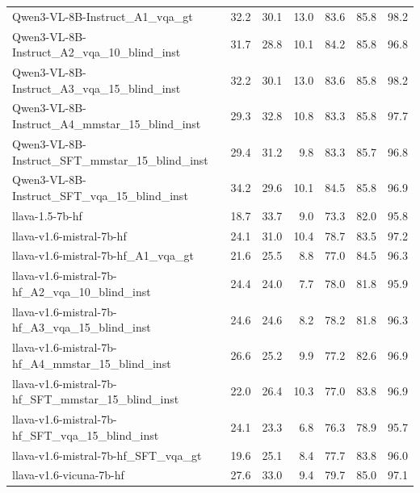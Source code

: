\begin{tabular}{lrrrrrr}
Qwen3-VL-8B-Instruct_A1_vqa_gt & 32.2 & 30.1 & 13.0 & 83.6 & 85.8 & 98.2 \\
Qwen3-VL-8B-Instruct_A2_vqa_10_blind_inst & 31.7 & 28.8 & 10.1 & 84.2 & 85.8 & 96.8 \\
Qwen3-VL-8B-Instruct_A3_vqa_15_blind_inst & 32.2 & 30.1 & 13.0 & 83.6 & 85.8 & 98.2 \\
Qwen3-VL-8B-Instruct_A4_mmstar_15_blind_inst & 29.3 & 32.8 & 10.8 & 83.3 & 85.8 & 97.7 \\
Qwen3-VL-8B-Instruct_SFT_mmstar_15_blind_inst & 29.4 & 31.2 & 9.8 & 83.3 & 85.7 & 96.8 \\
Qwen3-VL-8B-Instruct_SFT_vqa_15_blind_inst & 34.2 & 29.6 & 10.1 & 84.5 & 85.8 & 96.9 \\
llava-1.5-7b-hf & 18.7 & 33.7 & 9.0 & 73.3 & 82.0 & 95.8 \\
llava-v1.6-mistral-7b-hf & 24.1 & 31.0 & 10.4 & 78.7 & 83.5 & 97.2 \\
llava-v1.6-mistral-7b-hf_A1_vqa_gt & 21.6 & 25.5 & 8.8 & 77.0 & 84.5 & 96.3 \\
llava-v1.6-mistral-7b-hf_A2_vqa_10_blind_inst & 24.4 & 24.0 & 7.7 & 78.0 & 81.8 & 95.9 \\
llava-v1.6-mistral-7b-hf_A3_vqa_15_blind_inst & 24.6 & 24.6 & 8.2 & 78.2 & 81.8 & 96.3 \\
llava-v1.6-mistral-7b-hf_A4_mmstar_15_blind_inst & 26.6 & 25.2 & 9.9 & 77.2 & 82.6 & 96.9 \\
llava-v1.6-mistral-7b-hf_SFT_mmstar_15_blind_inst & 22.0 & 26.4 & 10.3 & 77.0 & 83.8 & 96.9 \\
llava-v1.6-mistral-7b-hf_SFT_vqa_15_blind_inst & 24.1 & 23.3 & 6.8 & 76.3 & 78.9 & 95.7 \\
llava-v1.6-mistral-7b-hf_SFT_vqa_gt & 19.6 & 25.1 & 8.4 & 77.7 & 83.8 & 96.0 \\
llava-v1.6-vicuna-7b-hf & 27.6 & 33.0 & 9.4 & 79.7 & 85.0 & 97.1 \\
\bottomrule
\end{tabular}
